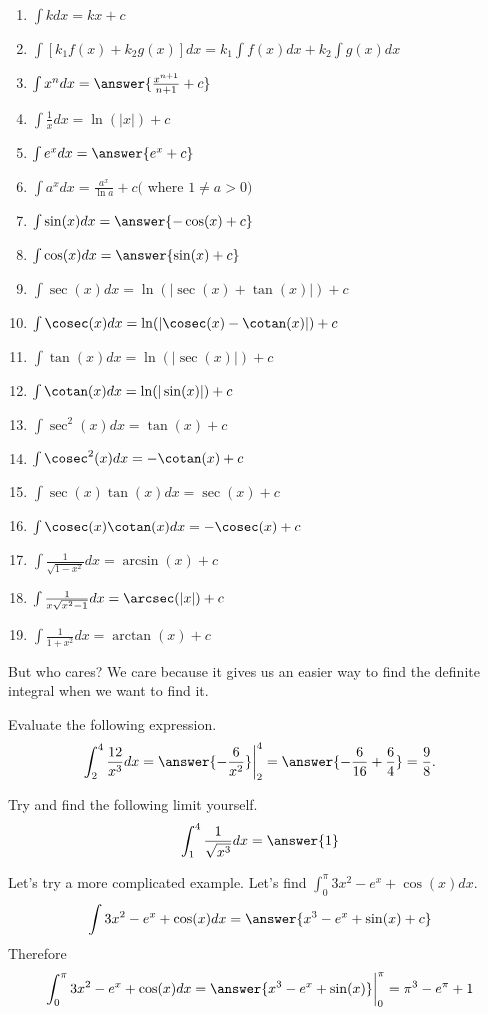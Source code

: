 \documentclass{ximera}
\begin{document}
\begin{enumerate}
  \item $\int k d x=k x+c$
  \item $\int\left[k_{1} f(x)+k_{2} g(x)\right] d x=k_{1} \int f(x) d x+k_{2} \int g(x) d x$
  \item $\int x^{n} d x=\answer{\frac{x^{n+1}}{n+1}+c}$
  \item $\int \frac{1}{x} d x=\ln (|x|)+c$
  \item $\int e^{x} d x=\answer{e^{x}+c}$
  \item $\int a^{x} d x=\frac{a^{x}}{\ln a}+c($ where $1 \neq a>0)$
  \item $\int \sin (x) d x=\answer{-\cos(x)+c}$
  \item $\int \cos (x) d x=\answer{\sin(x)+c}$
  \item $\int \sec (x) d x=\ln (|\sec (x)+\tan (x)|)+c$
  \item $\int \cosec(x) d x=\ln (|\cosec(x)-\cotan(x)|)+c$
  \item $\int \tan (x) d x=\ln (|\sec (x)|)+c$
  \item $\int \cotan(x) d x=\ln (|\sin (x)|)+c$
  \item $\int \sec ^{2}(x) d x=\tan (x)+c$
  \item $\int \cosec^{2}(x) d x=-\cotan(x)+c$
  \item $\int \sec (x) \tan (x) d x=\sec (x)+c$
  \item $\int \cosec(x) \cotan(x) d x=-\cosec(x)+c$
  \item $\int \frac{1}{\sqrt{1-x^{2}}} d x=\arcsin (x)+c$
  \item $\int \frac{1}{x \sqrt{x^{2}-1}} d x=\arcsec(|x|)+c$
  \item $\int \frac{1}{1+x^{2}} d x=\arctan (x)+c$
\end{enumerate}

But who cares? We care because it gives us an easier way to find the definite integral when we want to find it.

\begin{example}\label{example:13-5}
Evaluate the following expression.
\[
\int_{2}^{4} \frac{12}{x^{3}} d x=\answer{-\frac{6}{x^{2}}}\bigg|_{2}^{4}=\answer{-\frac{6}{16}+\frac{6}{4}}=\frac{9}{8} .
\]
\end{example}

\begin{exercise}\label{exercise:13-6}
Try and find the following limit yourself.
\[
\int_{1}^{4} \frac{1}{\sqrt{x^{3}}} d x=\answer{1}
\]
\end{exercise}

\begin{example}\label{example:13-7}
Let's try a more complicated example. Let's find $\int_{0}^{\pi} 3 x^{2}-e^{x}+\cos (x) d x$.
\[
\int 3 x^{2}-e^{x}+\cos (x) d x=\answer{x^{3}-e^{x}+\sin(x)+c}
\]
Therefore
\[
\int_{0}^{\pi} 3 x^{2}-e^{x}+\cos (x) d x=\answer{x^{3}-e^{x}+\sin(x)}\bigg|_{0}^{\pi}=\pi^{3}-e^{\pi}+1
\]
\end{example}
\end{document}
